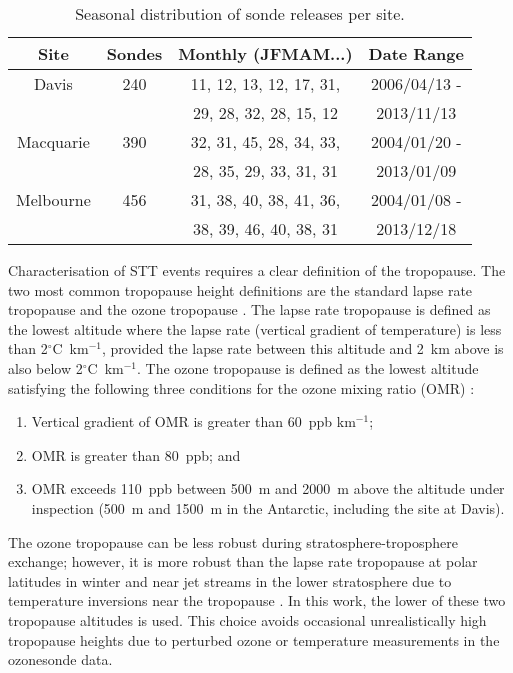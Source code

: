     \begin{table}[t]
      \caption{Seasonal distribution of sonde releases per site.}
      \begin{tabular}{| c | c | c | c |} 
	\hline
	Site & Sondes & Monthly (JFMAM...) & Date Range \\
	\hline
	Davis     & 240 & 11, 12, 13, 12, 17, 31,	& 2006/04/13 -  \\ 
		  &	& 29, 28, 32, 28, 15, 12 	& 2013/11/13	\\
	Macquarie & 390 & 32, 31, 45, 28, 34, 33,	& 2004/01/20 -  \\
		  &	& 28, 35, 29, 33, 31, 31 	& 2013/01/09	\\ 
	Melbourne & 456 & 31, 38, 40, 38, 41, 36,	& 2004/01/08 -  \\
		  &	& 38, 39, 46, 40, 38, 31        & 2013/12/18	\\
	\hline
      \end{tabular}
      \label{table:sondesummary}
    \end{table}
    
    Characterisation of STT events requires a clear definition of the tropopause.
    The two most common tropopause height definitions are the standard lapse rate tropopause \citep{WMO1957} and the ozone tropopause \citep{Bethan1996}.
    The lapse rate tropopause is defined as the lowest altitude where the lapse rate (vertical gradient of temperature) is less than 2$^\circ$C~km$^{-1}$, provided the lapse rate between this altitude and 2~km above is also below 2$^\circ$C~km$^{-1}$.
    The ozone tropopause is defined as the lowest altitude satisfying the following three conditions for the ozone mixing ratio (OMR) \citep{Bethan1996}:
    \begin{enumerate}
      \item Vertical gradient of OMR is greater than 60~ppb km$^{-1}$;
      \item OMR is greater than 80~ppb; and
      \item OMR exceeds 110~ppb between 500~m and 2000~m above the altitude under inspection (500~m and 1500~m in the Antarctic, including the site at Davis).
    \end{enumerate}
    The ozone tropopause can be less robust during stratosphere-troposphere exchange; however, it is more robust than the lapse rate tropopause at polar latitudes in winter and near jet streams in the lower stratosphere due to temperature inversions near the tropopause \citep{Bethan1996, Tomikawa2009, Alexander2013}.
    In this work, the lower of these two tropopause altitudes is used. 
    This choice avoids occasional unrealistically high tropopause heights due to perturbed ozone or temperature measurements in the ozonesonde data.
    
